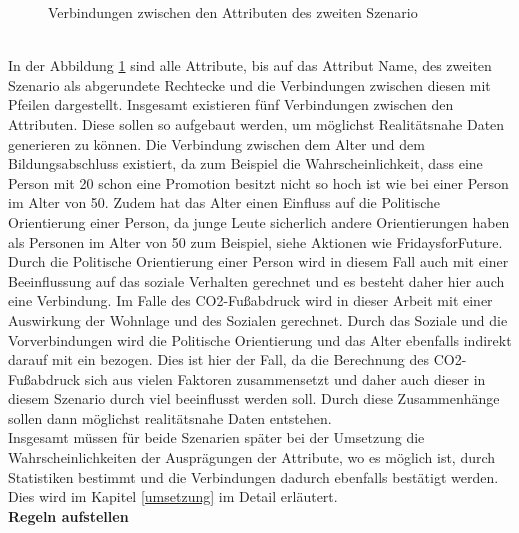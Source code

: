 \begin{onehalfspace}
\begin{figure}[h]
    \caption{Verbindungen zwischen den Attributen des zweiten Szenario}
    \label{fig:VerbindungenS2}
\end{figure}\\
In der Abbildung \ref{fig:VerbindungenS2} sind alle Attribute, bis auf das Attribut Name, des zweiten Szenario als abgerundete Rechtecke und die Verbindungen zwischen diesen mit Pfeilen dargestellt. Insgesamt existieren fünf Verbindungen zwischen den Attributen. Diese sollen so aufgebaut werden, um möglichst Realitätsnahe Daten generieren zu können. Die Verbindung zwischen dem Alter und dem Bildungsabschluss existiert, da zum Beispiel die Wahrscheinlichkeit, dass eine Person mit 20 schon eine Promotion besitzt nicht so hoch ist wie bei einer Person im Alter von 50. Zudem hat das Alter einen Einfluss auf die Politische Orientierung einer Person, da junge Leute sicherlich andere Orientierungen haben als Personen im Alter von 50 zum Beispiel, siehe Aktionen wie \glqq{}FridaysforFuture\grqq{}. Durch die Politische Orientierung einer Person wird in diesem Fall auch mit einer Beeinflussung auf das soziale Verhalten gerechnet und es besteht daher hier auch eine Verbindung. Im Falle des CO2-Fußabdruck wird in dieser Arbeit mit einer Auswirkung der Wohnlage und des Sozialen gerechnet. Durch das Soziale und die Vorverbindungen wird die Politische Orientierung und das Alter ebenfalls indirekt darauf mit ein bezogen. Dies ist hier der Fall, da die Berechnung des CO2-Fußabdruck sich aus vielen Faktoren zusammensetzt und daher auch dieser in diesem Szenario durch viel beeinflusst werden soll. Durch diese Zusammenhänge sollen dann möglichst realitätsnahe Daten entstehen.\\
Insgesamt müssen für beide Szenarien später bei der Umsetzung die Wahrscheinlichkeiten der Ausprägungen der Attribute, wo es möglich ist, durch Statistiken bestimmt und die Verbindungen dadurch ebenfalls bestätigt werden. Dies wird im Kapitel \ref{umsetzung} im Detail erläutert.\\
\textbf{Regeln aufstellen}\\

\end{onehalfspace}
